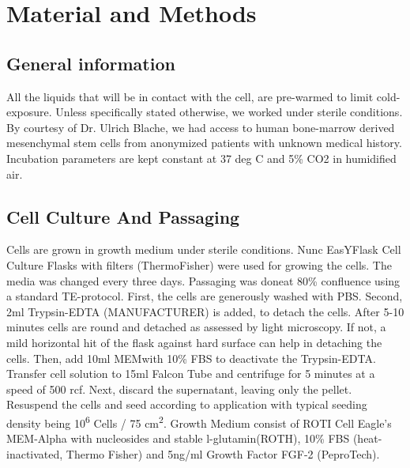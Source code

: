 \renewcommand{\package}{\emph}
\newcommand{\product}{\textit}

\chapter{Material and Methods}

\section{General information}
All the liquids that will be in contact with the cell, are pre-warmed to limit cold-exposure. Unless specifically stated otherwise, we worked under sterile conditions. By courtesy of Dr. Ulrich Blache, we had access to human bone-marrow derived mesenchymal stem cells from anonymized patients with unknown medical history. Incubation parameters are kept constant at 37 deg C and 5\% CO2 in humidified air.

\section{Cell Culture And Passaging}

Cells are grown in growth medium under sterile conditions. Nunc\texttrademark{} EasYFlask\texttrademark{} Cell Culture Flasks with filters (ThermoFisher) were used for growing the cells. The media was changed every three days. Passaging was doneat 80\% confluence using a standard TE-protocol. First, the cells are generously washed with PBS. Second, 2ml Trypsin-EDTA (MANUFACTURER) is added, to detach the cells. After 5-10 minutes cells are round and detached as assessed by light microscopy. If not, a mild horizontal hit of the flask against hard surface can help in detaching the cells. Then, add 10ml MEM\textalpha{ }with 10\% FBS to deactivate the Trypsin-EDTA. Transfer cell solution to 15ml Falcon Tube and centrifuge for 5 minutes at a speed of 500 rcf. Next, discard the supernatant, leaving only the pellet. Resuspend the cells and seed according to application with typical seeding density being 10\textsuperscript{6} Cells / 75 cm\textsuperscript{2}. 
Growth Medium consist of ROTI\textregistered{} Cell Eagle's MEM-Alpha with nucleosides and stable l-glutamin(ROTH), 10\% FBS (heat-inactivated, Thermo Fisher) and 5ng/ml Growth Factor FGF-2 (PeproTech).

